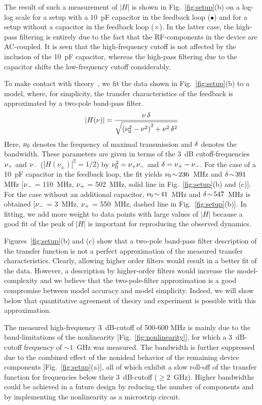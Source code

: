 \documentclass[aps,twocolumn,pre,nofootinbib]{revtex4}
\begin{document}
The result of such a  measurement of $|H|$ is shown in Fig.~\ref{fig:setup}(b) on a log-log scale for a setup with a 10~pF capacitor in the feedback loop ($\bullet$) and for a setup without a capacitor in the feedback loop ($\times$). In the latter case, the high-pass filtering is entirely due to the fact that the RF-components in the device are AC-coupled. It is seen that the high-frequency cutoff is not affected by the inclusion of the 10~pF capacitor, whereas the high-pass filtering due to the capacitor shifts the low-frequency cutoff considerably.

To make contact with theory~\cite{illing2005}, we fit the data shown in Fig.~\ref{fig:setup}(b) to a model, where, for simplicity, the transfer characteristics of the feedback is approximated by a two-pole band-pass filter.
\begin{equation}
\label{H}
\left| H(\nu) \right| = \frac{ \nu \, \delta}{\sqrt{ \left(\nu_0^2 - \nu^2 \right)^2 +  \nu^2 \, \delta^2 }}
\end{equation}
Here, $\nu_0$ denotes the frequency of maximal transmission and $\delta$ denotes the bandwidth. These parameters are given in terms of the 3~dB cutoff-frequencies $\nu_{+}$ and $\nu_{-}$ ($|H(\nu_{\pm})|^2 = 1/2$) by $\nu_0^2=\nu_{+} \nu_{-}$ and $\delta=\nu_{+} -\nu_{-}$.
For the case of a 10~pF capacitor in the feedback loop, the fit yields $\nu_0 \! \sim \! 236$~MHz and $\delta \! \sim \! 391$ MHz [$\nu_{-}$ = 110~MHz, $\nu_{+}$ = 502~MHz, solid line in Fig.~\ref{fig:setup}(b) and (c)]. For the case without an additional capacitor, $\nu_0 \! \sim \! 41$~MHz and $\delta \! \sim \! 547$~MHz is obtained [$\nu_{-}$ = 3~MHz, $\nu_{+}$ = 550~MHz, dashed line in Fig.~\ref{fig:setup}(b)].
In fitting, we add more weight to data points with large values of $|H|$ because a good fit of the peak of $|H|$ is important for reproducing the observed dynamics. 


Figures~\ref{fig:setup}(b) and (c) show that a two-pole band-pass filter description of the transfer function is not a perfect approximation of the measured transfer characteristics. Clearly, allowing higher order filters would result in a better fit of the data. However, a description by higher-order filters would increase the model-complexity and we believe that the two-pole-filter approximation is a good compromise between model accuracy and model simplicity. Indeed, we will show below that quantitative agreement of theory and experiment is possible with this approximation.

The measured high-frequency 3~dB-cutoff of  500-600 MHz is mainly due to the band-limitations of the nonlinearity [Fig.~\ref{fig:nonlinearity}], for which a 3~dB-cutoff frequency of $\sim \! 1 \!$~GHz was measured. The bandwidth is further suppressed due to the combined effect of the nonideal behavior of the remaining device components [Fig.~\ref{fig:setup}(a)], all of which exhibit a slow roll-off of the transfer function for frequencies below their 3~dB-cutoff ($\ge 2$~GHz).
Higher bandwidths could be achieved in a future design by reducing the number of components and by implementing the nonlinearity as a microstrip circuit.
\end{document}
